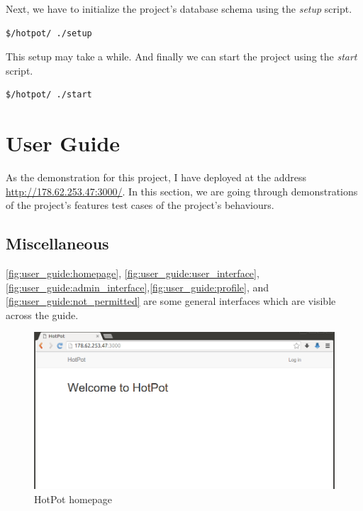 Next, we have to initialize the project's database schema using the \emph{setup} script.
\begin{lstlisting}[breaklines=false,frame=lt]
$/hotpot/ ./setup
\end{lstlisting}
This setup may take a while. And finally we can start the project using the \emph{start} script.
\begin{lstlisting}[breaklines=false,frame=lt]
$/hotpot/ ./start
\end{lstlisting}


\section{User Guide}
\label{ch:result:user_guide}

As the demonstration for this project, I have deployed \myProject at the address \href{http://178.62.253.47:3000/}{http://178.62.253.47:3000/}.
In this section, we are going through demonstrations of the project's features \ie test cases of the project's behaviours.

\subsection{Miscellaneous}
\label{ch:result:user_guide:miscellaneous}
\autoref{fig:user_guide:homepage}, \autoref{fig:user_guide:user_interface}, \autoref{fig:user_guide:admin_interface},\autoref{fig:user_guide:profile}, and \autoref{fig:user_guide:not_permitted} are some general interfaces which are visible across the guide.

\begin{figure}[bth]                                                                                                                                                  \myfloatalign
\includegraphics[width=1.0\linewidth]{gfx/chapter_5/general/homepage}
\caption[HotPot homepage]{HotPot homepage}
\label{fig:user_guide:homepage}
\end{figure}

